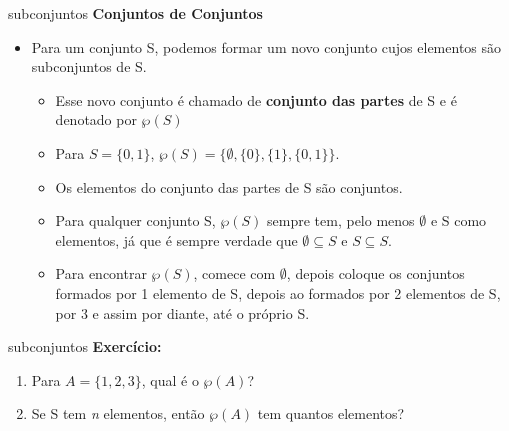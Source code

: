 \documentclass[aspectratio=169]{beamer}
\begin{document}
 \begin{frame}{subconjuntos}
    \textbf{Conjuntos de Conjuntos}
    \begin{itemize}
        \item Para um conjunto S, podemos formar um novo conjunto cujos elementos são subconjuntos de S.
        \begin{itemize}
            \item Esse novo conjunto é chamado de \textbf{conjunto das partes} de S e é denotado por $\wp(S) $
            \item Para $S=\{0,1\}$, $\wp(S) = \{\emptyset, \{0\}, \{1\}, \{0,1\}\}.$
            \item Os elementos do conjunto das partes de S são conjuntos.
            \item Para qualquer conjunto S, $\wp(S)$ sempre tem, pelo menos $\emptyset$ e S como elementos, já que é sempre verdade que $\emptyset \subseteq S$ e $S \subseteq S.$
            \item Para encontrar $\wp(S)$, comece com $\emptyset$, depois coloque os conjuntos formados por 1 elemento de S, depois ao formados por 2 elementos de S, por 3 e assim por diante, até o próprio S.
        \end{itemize}
    \end{itemize}
\end{frame}

\begin{frame}{subconjuntos}
    \textbf{Exercício:} 
    
    \begin{enumerate}
        \item Para $A=\{1,2,3\}$, qual é o $\wp(A)$?
        \vspace{4mm}
        \item Se S tem \textit{n} elementos, então $\wp(A)$ tem quantos elementos?
    \end{enumerate}
        
\end{frame}
\end{document}
